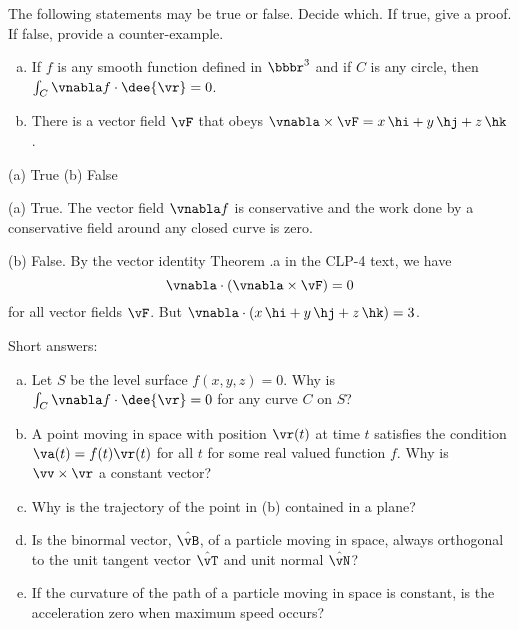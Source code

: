 \begin{question}[M317 2004A] %
The following statements may be true or false. Decide which. 
If true, give a proof. If false, provide a counter-example.

\begin{enumerate}[(a)]
\item
If $f$ is any smooth function defined in 
$\bbbr^3$ and if $C$ is any circle, then
$\int_{C}\vnabla f \cdot \dee{\vr}=0$.
 
\item
There is a vector field $\vF$ that 
obeys $\vnabla\times\vF=x\,\hi+y\,\hj+z\,\hk$.

\end{enumerate}
\end{question}


\begin{answer} 
(a) True\qquad
(b) False
\end{answer}


\begin{solution}
(a) True. The vector field $\vnabla f$ is conservative
and the work done by a conservative field around any closed curve
is zero.

(b) False. By the vector identity Theorem .a
in the CLP-4 text, we have 
\begin{equation*}
  \vnabla\cdot(\vnabla\times\vF)=0
\end{equation*}
for all vector fields $\vF$.
But $\vnabla\cdot(x\,\hi+y\,\hj+z\,\hk)=3$.
\end{solution}

\begin{question}[M317 2002A] %
Short answers:
\begin{enumerate}[(a)]
\item %
 Let $S$ be the level surface $f(x,y,z)=0$. Why is 
$\int_C \vnabla f\cdot \dee{\vr}=0$ for any curve $C$ on $S$?
\item %
A point moving in space with position $\vr(t)$ at time $t$
satisfies the condition $\va(t)=f(t)\vr(t)$ for all $t$ for some real valued
function $f$. Why is $\vv\times\vr$ a constant vector?
\item %
Why is the trajectory of the point in (b) contained in a plane?
\item %
Is the binormal vector, $\hat\vB$, of a particle moving in space, always
orthogonal to the unit tangent vector $\hat\vT$ and unit normal 
$\hat\vN$?
\item %
If the curvature of the path of a particle moving in space
is constant, is the acceleration zero when maximum speed occurs?
\end{enumerate}
\end{question}

